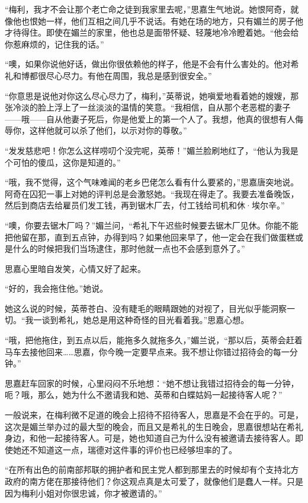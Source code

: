 \par “梅利，我才不会让那个老亡命之徒到我家里去呢，”思嘉生气地说。她恨阿奇，就像他也恨她一样，他们互相之间几乎不说话。有她在场的地方，只有媚兰的房子他才待得住。即使在媚兰的家里，他也总是面带怀疑、轻蔑地冷冷瞪着她。“他会给你惹麻烦的，记住我的话。”
\par “噢，如果你说他好话，做出你很依赖他的样子，他是不会有什么害处的。他对希礼和博都很尽心尽力。有他在周围，我总是感到很安全。”
\par “你意思是说他对你这么尽心尽力了，梅利，”英蒂说，她嗔爱地看着她的嫂嫂，那张冷淡的脸上浮上了一丝淡淡的温情的笑意。“我相信，自从那个老恶棍的妻子——哦——自从他妻子死后，你是他爱上的第一个人了。我想，他真的很想有人侮辱你，这样他就可以杀了他们，以示对你的尊敬。”
\par “发发慈悲吧！你怎么这样唠叨个没完呢，英蒂！”媚兰脸刷地红了，“他认为我是个可怕的傻瓜，这你是知道的。”
\par “哦，我不觉得，这个气味难闻的老乡巴佬怎么看有什么要紧的，”思嘉唐突地说。阿奇在囚犯一事上对她的评判总是会激怒她。“我现在得走了。我要去准备晚饭，然后到商店去给雇员们发工钱，再到锯木厂去，付工钱给司机和休·埃尔辛。”
\par “噢，你要去锯木厂吗？”媚兰问，“希礼下午迟些时候要去锯木厂见休。你能不能把他留在那，直到五点钟，办得到吗？如果他回来早了，他一定会在我们做蛋糕或是什么的时候把我们当场逮住，那时他就一点也不会感到意外了。”
\par 思嘉心里暗自发笑，心情又好了起来。
\par “好的，我会拖住他。”她说。
\par 她这么说的时候，英蒂苍白、没有睫毛的眼睛跟她的对视了，目光似乎能洞察一切。“我一谈到希礼，她总是用这种奇怪的目光看着我。”思嘉心想。
\par “哦，把他拖住，到五点以后，能拖多久就拖多久，”媚兰说，“那以后，英蒂会赶着马车去接他回来……思嘉，你今晚一定要早点来。我不想让你错过招待会的每一分钟。”
\par 思嘉赶车回家的时候，心里闷闷不乐地想：“她不想让我错过招待会的每一分钟，呃？哦，那么，她为什么不邀请我和她、英蒂和白蝶姑妈一起接待客人呢？”
\par 一般说来，在梅利微不足道的晚会上招待不招待客人，思嘉是不会在乎的。可是，这次是媚兰举办过的最大型的晚会，而且又是希礼的生日晚会，思嘉很想站在希礼身边，和他一起接待客人。可是，她也知道自己为什么没有被邀请去接待客人。即使她还不知道这一点，瑞德对这件事的评价也已经够坦率的了。
\par “在所有出色的前南部邦联的拥护者和民主党人都到那里去的时候却有个支持北方政府的南方佬在那接待他们？你这观点真是太可爱了，就像他们是蠢人一样。只是因为梅利小姐对你很忠诚，你才被邀请的。”
